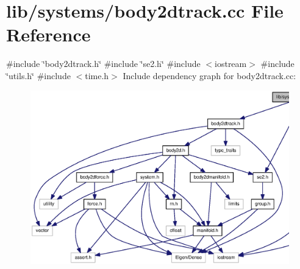 \section{lib/systems/body2dtrack.cc \-File \-Reference}
\label{body2dtrack_8cc}
{\ttfamily \#include \char`\"{}body2dtrack.\-h\char`\"{}}\*
{\ttfamily \#include \char`\"{}se2.\-h\char`\"{}}\*
{\ttfamily \#include $<$iostream$>$}\*
{\ttfamily \#include \char`\"{}utils.\-h\char`\"{}}\*
{\ttfamily \#include $<$time.\-h$>$}\*
\-Include dependency graph for body2dtrack.\-cc\-:
\nopagebreak
\begin{figure}[H]
\begin{center}
\leavevmode
\includegraphics[width=350pt]{body2dtrack_8cc__incl}
\end{center}
\end{figure}
